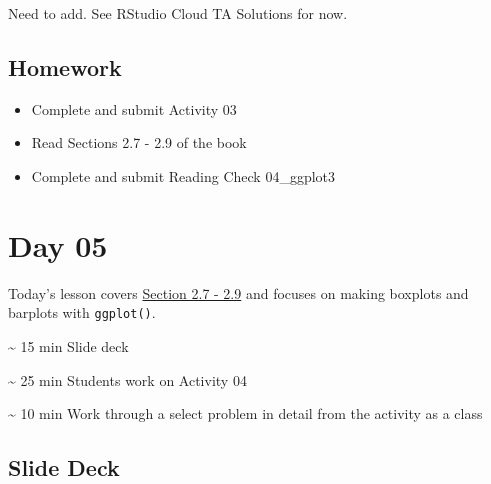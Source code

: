 \documentclass[
  letterpaper,
  DIV=11,
  numbers=noendperiod]{scrreprt}
\begin{document}
Need to add. See RStudio Cloud TA Solutions for now.

\hypertarget{homework-3}{%
\section*{Homework}\label{homework-3}}

\begin{itemize}
\item
  Complete and submit Activity 03
\item
  Read Sections 2.7 - 2.9 of the book
\item
  Complete and submit Reading Check 04\_ggplot3
\end{itemize}


\hypertarget{day-05}{%
\chapter*{Day 05}\label{day-05}}

Today's lesson covers
\href{https://nustat.github.io/intro-stat-data-sci/02-visualization.html}{Section
2.7 - 2.9} and focuses on making boxplots and barplots with
\texttt{ggplot()}.

\begin{tcolorbox}[enhanced jigsaw, colframe=quarto-callout-note-color-frame, breakable, colback=white, toprule=.15mm, leftrule=.75mm, title={Agenda}, left=2mm, coltitle=black, bottomtitle=1mm, bottomrule=.15mm, rightrule=.15mm, colbacktitle=quarto-callout-note-color!10!white, opacitybacktitle=0.6, opacityback=0, toptitle=1mm, arc=.35mm, titlerule=0mm]
\textasciitilde{} 15 min Slide deck

\textasciitilde{} 25 min Students work on Activity 04

\textasciitilde{} 10 min Work through a select problem in detail from
the activity as a class
\end{tcolorbox}

\hypertarget{slide-deck-4}{%
\section*{Slide Deck}\label{slide-deck-4}}
\end{document}
